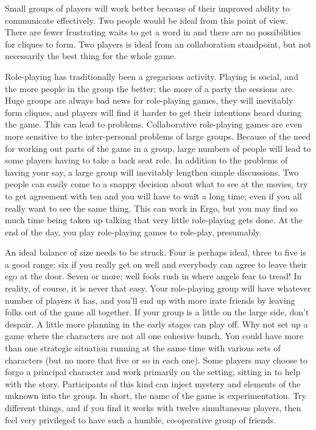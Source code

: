\documentclass[twoside]{book}
\begin{document}
Small groups of players will work better because of their improved
ability to communicate effectively. Two people would be ideal from
this point of view. There are fewer frustrating waits to get a word in
and there are no possibilities for cliques to form. Two players is
ideal from an collaboration standpoint, but not necessarily the best
thing for the whole game.

Role-playing has traditionally been a gregarious activity. Playing is
social, and the more people in the group the better; the more of a
party the sessions are. Huge groups are always bad news for
role-playing games, they will inevitably form cliques, and players
will find it harder to get their intentions heard during the
game. This can lead to problems. Collaborative role-playing games are
even more sensitive to the inter-personal problems of large
groups. Because of the need for working out parts of the game in a
group, large numbers of people will lead to some players having to
take a back seat role. In addition to the problems of having your say,
a large group will inevitably lengthen simple discussions. Two people
can easily come to a snappy decision about what to see at the movies,
try to get agreement with ten and you will have to wait a long time;
even if you all really want to see the same thing. This can work in
Ergo, but you may find so much time being taken up talking that very
little role-playing gets done. At the end of the day, you play
role-playing games to role-play, presumably.

An ideal balance of size needs to be struck. Four is perhaps ideal,
three to five is a good range; six if you really get on well and
everybody can agree to leave their ego at the door. Seven or more;
well fools rush in where angels fear to tread! In reality, of course,
it is never that easy. Your role-playing group will have whatever
number of players it has, and you'll end up with more irate friends by
leaving folks out of the game all together. If your group is a little
on the large side, don't despair. A little more planning in the early
stages can play off. Why not set up a game where the characters are
not all one cohesive bunch. You could have more than one strategic
situation running at the same time with various sets of characters
(but no more that five or so in each one). Some players may choose to
forgo a principal character and work primarily on the setting, sitting
in to help with the story. Participants of this kind can inject
mystery and elements of the unknown into the group. In short, the name
of the game is experimentation. Try different things, and if you find
it works with twelve simultaneous players, then feel very privileged
to have such a humble, co-operative group of friends.
\end{document}
